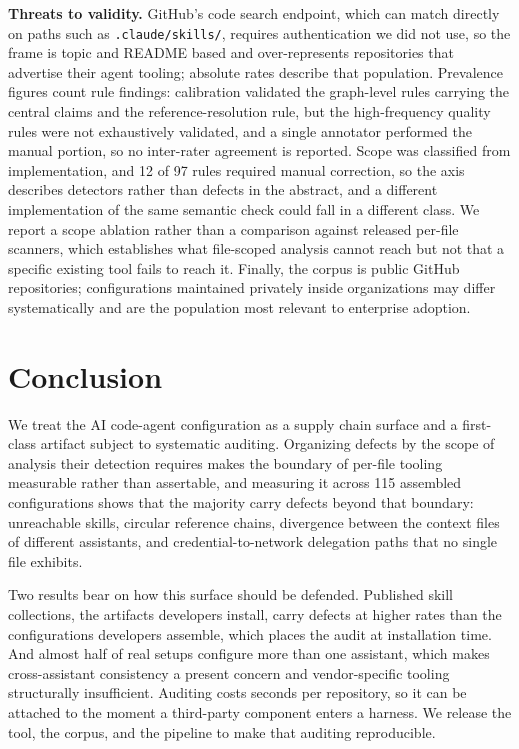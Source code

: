 \documentclass[conference]{IEEEtran}
\begin{document}
\textbf{Threats to validity.} GitHub's code search endpoint, which can match
directly on paths such as \texttt{.claude/skills/}, requires authentication we
did not use, so the frame is topic and README based and over-represents
repositories that advertise their agent tooling; absolute rates describe that
population. Prevalence figures count rule findings: calibration validated the
graph-level rules carrying the central claims and the reference-resolution rule,
but the high-frequency quality rules were not exhaustively validated, and a
single annotator performed the manual portion, so no inter-rater agreement is
reported. Scope was classified from implementation, and 12 of 97 rules required
manual correction, so the axis describes detectors rather than defects in the
abstract, and a different implementation of the same semantic check could fall
in a different class. We report a scope ablation rather than a comparison against
released per-file scanners, which establishes what file-scoped analysis cannot
reach but not that a specific existing tool fails to reach it. Finally, the
corpus is public GitHub repositories; configurations maintained privately inside
organizations may differ systematically and are the population most relevant to
enterprise adoption.

\section{Conclusion}

We treat the AI code-agent configuration as a supply chain surface and a
first-class artifact subject to systematic auditing. Organizing defects by the
scope of analysis their detection requires makes the boundary of per-file
tooling measurable rather than assertable, and measuring it across 115 assembled
configurations shows that the majority carry defects beyond that boundary:
unreachable skills, circular reference chains, divergence between the context
files of different assistants, and credential-to-network delegation paths that
no single file exhibits.

Two results bear on how this surface should be defended. Published skill
collections, the artifacts developers install, carry defects at higher rates than
the configurations developers assemble, which places the audit at installation
time. And almost half of real setups configure more than one assistant, which
makes cross-assistant consistency a present concern and vendor-specific tooling
structurally insufficient. Auditing costs seconds per repository, so it can be
attached to the moment a third-party component enters a harness. We release the
tool, the corpus, and the pipeline to make that auditing reproducible.
\end{document}
